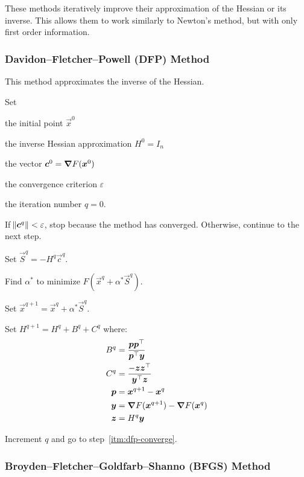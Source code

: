 \documentclass{article}
\begin{document}
These methods iteratively improve their approximation of the Hessian or its inverse. This allows
them to work similarly to Newton's method, but with only first order information.

\subsubsection{Davidon--Fletcher--Powell (DFP) Method}

This method approximates the inverse of the Hessian.

\begin{enumerate*}
\item Set
  \begin{itemize*}
  \item the initial point \(\vec{x}^0\)
  \item the inverse Hessian approximation \(H^0 = I_n\)
  \item the vector \(\bm{c}^0 = \bm{\nabla} F(\bm{x}^0)\)
  \item the convergence criterion \(\varepsilon\)
  \item the iteration number \(q = 0\).
  \end{itemize*}
\item \label{itm:dfp-converge} If \(\norm{\bm{c}^q} < \varepsilon\), stop because the method has converged. Otherwise,
  continue to the next step.
\item Set \(\vec{S}^q = -H^q \vec{c}^q\).
\item Find \(\alpha^*\) to minimize \(F(\vec{x}^q + \alpha^* \vec{S}^q)\).
\item Set \(\vec{x}^{q+1} = \vec{x}^q + \alpha^* \vec{S}^q\).
\item Set \(H^{q+1} = H^q + B^q + C^q\) where:
  \begin{align*}
    B^q &= \frac{\bm{p}{{\bm{p}}^\top}}{{{\bm{p}}^\top}\bm{y}} \\
    C^q &= \frac{-\bm{z}{{\bm{z}}^\top}}{{{\bm{y}}^\top}\bm{z}} \\
    \bm{p} &= \bm{x}^{q+1} - \bm{x}^q \\
    \bm{y} &= \bm{\nabla} F(\bm{x}^{q+1}) - \bm{\nabla} F(\bm{x}^q) \\
    \bm{z} &= H^q \bm{y}
  \end{align*}
\item Increment \(q\) and go to step~\ref{itm:dfp-converge}.
\end{enumerate*}

\subsubsection{Broyden--Fletcher--Goldfarb--Shanno (BFGS) Method}
\end{document}
